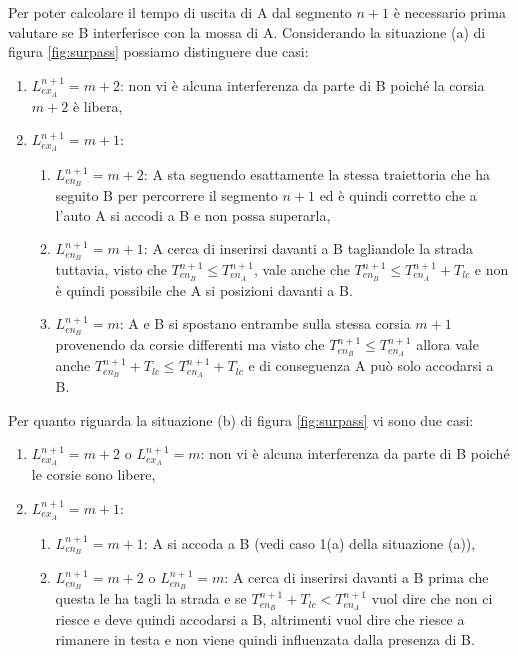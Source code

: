 \documentclass[11pt,a4paper]{report}
\begin{document}
Per poter calcolare il tempo di uscita di A dal segmento $n+1$ è necessario prima valutare se B interferisce con la mossa di A.
Considerando la situazione (a) di figura \ref{fig:surpass} possiamo distinguere due casi:
\begin{enumerate}
\item $L_{ex_A}^{n+1} = m+2$: non vi è alcuna interferenza da parte di B poiché la corsia $m+2$ è libera,
\item $L_{ex_A}^{n+1} = m+1$:
  \begin{enumerate}
  \item $L_{en_B}^{n+1} = m+2$: A sta seguendo esattamente la stessa traiettoria che ha seguito B per percorrere il segmento $n+1$ ed è quindi corretto che a l'auto A si accodi a B e non possa superarla,
  \item $L_{en_B}^{n+1} = m+1$: A cerca di inserirsi davanti a B tagliandole la strada tuttavia, visto che $T_{en_B}^{n+1} \leq T_{en_A}^{n+1}$, vale anche che $T_{en_B}^{n+1} \leq T_{en_A}^{n+1} + T_{lc}$ e non è quindi possibile che A si posizioni davanti a B.
  \item $L_{en_B}^{n+1} = m$: A e B si spostano entrambe sulla stessa corsia $m+1$ provenendo da corsie differenti ma visto che $T_{en_B}^{n+1} \leq T_{en_A}^{n+1}$ allora vale anche $T_{en_B}^{n+1} + T_{lc} \leq T_{en_A}^{n+1} + T_{lc}$ e di conseguenza A può solo accodarsi a B.
  \end{enumerate}
\end{enumerate}

Per quanto riguarda la situazione (b) di figura \ref{fig:surpass} vi sono due casi:
\begin{enumerate}
\item $L_{ex_A}^{n+1} = m+2$ o $L_{ex_A}^{n+1} = m$: non vi è alcuna interferenza da parte di B poiché le corsie sono libere,
\item $L_{ex_A}^{n+1} = m+1$:
  \begin{enumerate}
  \item $L_{en_B}^{n+1} = m+1$: A si accoda a B (vedi caso 1(a) della situazione (a)),
  \item $L_{en_B}^{n+1} = m+2$ o $L_{en_B}^{n+1} = m$: A cerca di inserirsi davanti a B prima che questa le ha tagli la strada e se $T_{en_B}^{n+1} + T_{lc} < T_{en_A}^{n+1}$ vuol dire che non ci riesce e deve quindi accodarsi a B, altrimenti vuol dire che riesce a rimanere in testa e non viene quindi influenzata dalla presenza di B.
  \end{enumerate}
\end{enumerate}
\end{document}
